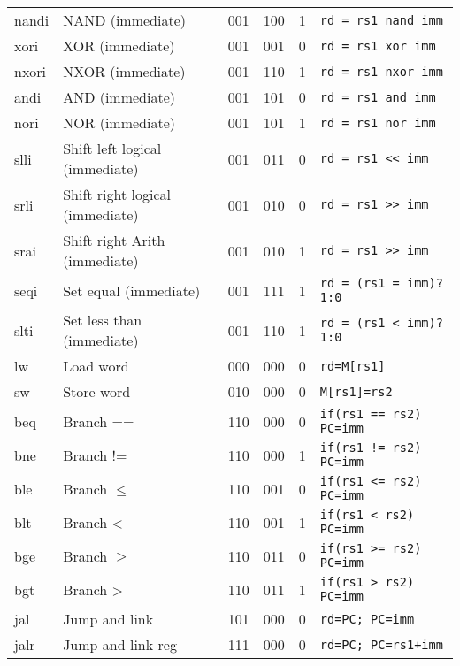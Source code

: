 \documentclass[a4paper]{article}
\begin{document}
\begin{tabular}{|l|l|c|c|c|l|}
        nandi & NAND (immediate)                & 001    & 100    & 1      & \texttt{rd = rs1 nand imm}    \\
        xori  & XOR (immediate)                 & 001    & 001    & 0      & \texttt{rd = rs1 xor imm}     \\
        nxori & NXOR (immediate)                & 001    & 110    & 1      & \texttt{rd = rs1 nxor imm}    \\
        andi  & AND (immediate)                 & 001    & 101    & 0      & \texttt{rd = rs1 and imm}     \\
        nori  & NOR (immediate)                 & 001    & 101    & 1      & \texttt{rd = rs1 nor imm}     \\
        slli  & Shift left logical (immediate)  & 001    & 011    & 0      & \texttt{rd = rs1 << imm}      \\
        srli  & Shift right logical (immediate) & 001    & 010    & 0      & \texttt{rd = rs1 >> imm}      \\
        srai  & Shift right Arith (immediate)   & 001    & 010    & 1      & \texttt{rd = rs1 >> imm}      \\
        seqi  & Set equal (immediate)           & 001    & 111    & 1      & \texttt{rd = (rs1 = imm)?1:0} \\
        slti  & Set less than (immediate)       & 001    & 110    & 1      & \texttt{rd = (rs1 < imm)?1:0} \\
        \hline
        lw    & Load word                       & 000    & 000    & 0      & \texttt{rd=M[rs1]}            \\
        sw    & Store word                      & 010    & 000    & 0      & \texttt{M[rs1]=rs2}           \\
        \hline

        beq   & Branch ==                       & 110    & 000    & 0      & \texttt{if(rs1 == rs2) PC=imm}\\
        bne   & Branch !=                       & 110    & 000    & 1      & \texttt{if(rs1 != rs2) PC=imm}\\
        ble   & Branch \(\leqslant\)            & 110    & 001    & 0      & \texttt{if(rs1 <= rs2) PC=imm}\\
        blt   & Branch <                        & 110    & 001    & 1      & \texttt{if(rs1 < rs2) PC=imm} \\
        bge   & Branch \(\geqslant\)            & 110    & 011    & 0      & \texttt{if(rs1 >= rs2) PC=imm}\\
        bgt   & Branch >                        & 110    & 011    & 1      & \texttt{if(rs1 > rs2) PC=imm} \\

        \hline
        jal  & Jump and link                    & 101    & 000    & 0      &\texttt{rd=PC; PC=imm}         \\
        jalr & Jump and link reg                & 111    & 000    & 0      &\texttt{rd=PC; PC=rs1+imm}     \\
        \hline
    \end{tabular}
\end{document}
